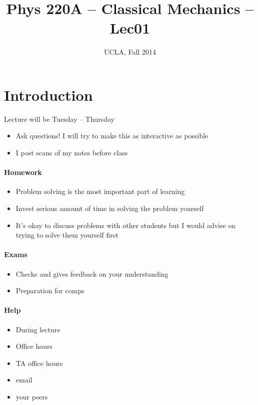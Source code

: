 \documentclass[12pt]{article} %
\title{Phys 220A -- Classical Mechanics -- Lec01}
\author{UCLA, Fall 2014}
\date{\formatdate{02}{10}{2014}} %
\begin{document}
\setlength{\unitlength}{1mm}
\maketitle


\section{Introduction}

Lecture will be Tuesday -- Thursday
\begin{itemize}
\item Ask questions! I will try to make this as interactive as possible
\item I post scans of my notes before class
\end{itemize}

\paragraph{Homework}
\begin{itemize}
\item Problem solving is the most important part of learning
\item Invest serious amount of time in solving the problem yourself
\item It's okay to discuss problems with other students but I would advise on trying to solve them yourself first
\end{itemize}

\paragraph{Exams}
\begin{itemize}
\item Checks and gives feedback on your understanding
\item Preparation for comps
\end{itemize}

\paragraph{Help}
\begin{itemize}
\item During lecture
\item Office hours
\item TA office hours
\item email
\item your peers
\end{itemize}
\end{document}

